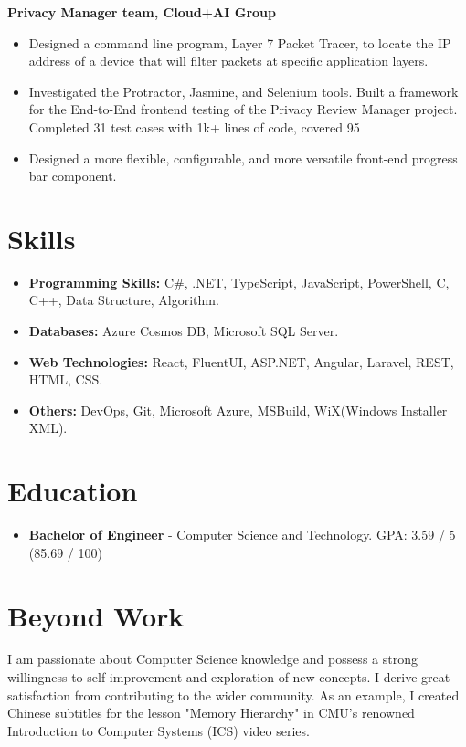 \documentclass{resume}
\begin{document}
\textbf{Privacy Manager team, Cloud+AI Group}
\begin{itemize}
  \item Designed a command line program, Layer 7 Packet Tracer, to locate the IP address of a device that will filter packets at specific application layers.
  \item Investigated the Protractor, Jasmine, and Selenium tools. Built a framework for the End-to-End frontend testing of the Privacy Review Manager project. Completed 31 test cases with 1k+ lines of code, covered 95%
  \item Designed a more flexible, configurable, and more versatile front-end progress bar component.
\end{itemize}

\section{Skills}
\begin{itemize}[parsep=0.5ex]
  \item \textbf{Programming Skills:} C\#, .NET, TypeScript, JavaScript, PowerShell, C, C++, Data Structure, Algorithm. 
  \item \textbf{Databases:} Azure Cosmos DB, Microsoft SQL Server.
  \item \textbf{Web Technologies:} React, FluentUI, ASP.NET, Angular, Laravel, REST, HTML, CSS.
  \item \textbf{Others:} DevOps, Git, Microsoft Azure, MSBuild, WiX(Windows Installer XML).
\end{itemize}

\section{Education}
\begin{itemize}
  \item \textbf{Bachelor of Engineer} - Computer Science and Technology. GPA: 3.59 / 5 (85.69 / 100)
\end{itemize}

\section{Beyond Work}
I am passionate about Computer Science knowledge and possess a strong willingness to self-improvement and exploration of new concepts. I derive great satisfaction from contributing to the wider community. As an example, I created Chinese subtitles for the lesson "Memory Hierarchy" in CMU's renowned Introduction to Computer Systems (ICS) video series.

%
%
\end{document}
